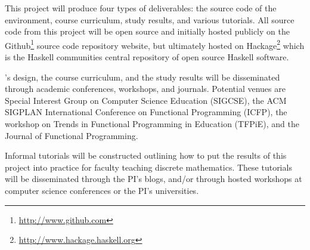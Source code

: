 This project will produce four types of deliverables: the source code
of the \thelang{} environment, course curriculum, study results, and
various tutorials.  All source code from this project will be open
source and initially hosted publicly on the
Github\footnote{\url{http://www.github.com}} source code repository
website, but ultimately hosted on
Hackage\footnote{\url{http://www.hackage.haskell.org}} which is the
Haskell communities central repository of open source Haskell
software.

\thelang{}'s design, the course curriculum, and the study results
will be disseminated through academic conferences, workshops, and
journals.  Potential venues are Special Interest Group on Computer
Science Education (SIGCSE), the ACM SIGPLAN International Conference
on Functional Programming (ICFP), the workshop on Trends in Functional
Programming in Education (TFPiE), and the Journal of Functional
Programming.

Informal tutorials will be constructed outlining how to put the
results of this project into practice for faculty teaching discrete
mathematics.  These tutorials will be disseminated through the PI's
blogs, and/or through hosted workshops at computer science conferences
or the PI's universities.
